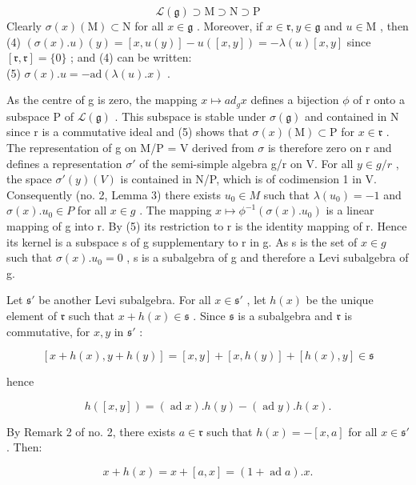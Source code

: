 \[
\mathcal{L}(\mathfrak{g}) \supset \mathrm{M} \supset \mathrm{N} \supset \mathrm{P}
\]
Clearly \(\sigma (x)(\mathrm{M})\subset \mathrm{N}\) for all \(x\in \mathfrak{g}\) . Moreover, if \(x\in \mathfrak{r},y\in \mathfrak{g}\) and \(u\in \mathrm{M}\) , then\\
(4) \((\sigma (x).u)(y) = [x,u(y)] - u([x,y]) = -\lambda (u)[x,y]\) since \([\mathfrak{r},\mathfrak{r}] = \{0\}\) ; and (4) can be written:\\
(5) \(\sigma (x).u = -\mathrm{ad}(\lambda (u).x)\) .

As the centre of g is zero, the mapping \(x \mapsto ad_{g}x\) defines a bijection \(\phi\) of r onto a subspace P of \(\mathcal{L}(\mathfrak{g})\) . This subspace is stable under \(\sigma(\mathfrak{g})\) and contained in N since r is a commutative ideal and (5) shows that \(\sigma(x)(\mathrm{M}) \subset \mathrm{P}\) for \(x \in \mathfrak{r}\) . The representation of g on M/P = V derived from \(\sigma\) is therefore zero on r and defines a representation \(\sigma'\) of the semi-simple algebra g/r on V. For all \(y \in g/r\) , the space \(\sigma'(y)(V)\) is contained in N/P, which is of codimension 1 in V. Consequently (no. 2, Lemma 3) there exists \(u_{0} \in M\) such that \(\lambda(u_{0}) = -1\) and \(\sigma(x).u_{0} \in P\) for all \(x \in g\) . The mapping \(x \mapsto \phi^{-1}(\sigma(x).u_{0})\) is a linear mapping of g into r. By (5) its restriction to r is the identity mapping of r. Hence its kernel is a subspace s of g supplementary to r in g. As s is the set of \(x \in g\) such that \(\sigma(x).u_{0} = 0\) , s is a subalgebra of g and therefore a Levi subalgebra of g.

Let \(\mathfrak{s}'\) be another Levi subalgebra. For all \(x \in \mathfrak{s}'\) , let \(h(x)\) be the unique element of \(\mathfrak{r}\) such that \(x + h(x) \in \mathfrak{s}\) . Since \(\mathfrak{s}\) is a subalgebra and \(\mathfrak{r}\) is commutative, for \(x, y\) in \(\mathfrak{s}'\) :

\[
[ x + h (x), y + h (y) ] = [ x, y ] + [ x, h (y) ] + [ h (x), y ] \in \mathfrak {s}
\]

hence

\[
h ([ x, y ]) = (\operatorname{ad} x). h (y) - (\operatorname{ad} y). h (x).
\]

By Remark 2 of no. 2, there exists \(a \in \mathfrak{r}\) such that \(h(x) = -[x, a]\) for all \(x \in \mathfrak{s}'\) . Then:

\[
x + h (x) = x + [ a, x ] = (1 + \operatorname{ad} a). x.\tag{6}
\]

